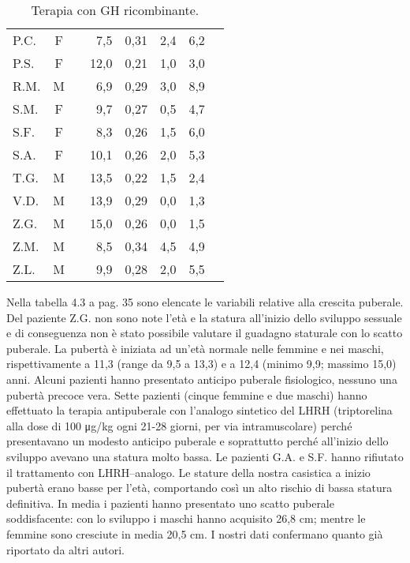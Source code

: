 \begin{table}[!h]
\begin{center}
\begin{tabular}{lccrcccl}
P.C.	& F &  		 & 7,5   	&  0,31     	& 2,4                 & 6,2  \\
P.S.	& F &  		 & 12,0  	&  0,21     	& 1,0                 & 3,0  \\
R.M.	& M & \checkmark & 6,9   	&  0,29     	& 3,0                 & 8,9  \\
S.M.	& F &  	  	 & 9,7   	&  0,27     	& 0,5                 & 4,7  \\
S.F.	& F &  		 & 8,3   	&  0,26     	& 1,5                 & 6,0  \\
S.A.	& F &  		 & 10,1  	&  0,26     	& 2,0                 & 5,3  \\
T.G.    & M &            & 13,5         &  0,22         & 1,5                 & 2,4  \\
V.D.	& M &  		 & 13,9  	&  0,29     	& 0,0                 & 1,3  \\
Z.G.	& M &  		 & 15,0  	&  0,26     	& 0,0                 & 1,5  \\
Z.M.	& M &  		 & 8,5   	&  0,34     	& 4,5                 & 4,9  \\
Z.L.	& M &  		 & 9,9   	&  0,28     	& 2,0                 & 5,5  \\
\bottomrule
\end{tabular}
\end{center}
\caption{Terapia con GH ricombinante.}
\label{tab:Terapia}
\end{table}

Nella tabella 4.3 a pag. 35 sono elencate le variabili relative alla crescita puberale. Del paziente Z.G. non sono note l'età e la statura all'inizio dello sviluppo sessuale e di conseguenza non è stato possibile valutare il guadagno staturale con lo scatto puberale.
La pubertà è iniziata ad un'età normale nelle femmine e nei maschi, rispettivamente a 11,3 (range da 9,5 a 13,3) e a 12,4 (minimo 9,9; massimo 15,0) anni. 
Alcuni pazienti hanno presentato anticipo puberale fisiologico, nessuno una pubertà precoce vera. 
Sette pazienti (cinque femmine e due maschi) hanno effettuato la terapia antipuberale con  l'analogo sintetico del LHRH (triptorelina alla dose di 100 \unit{\micro g}/kg ogni 21-28 giorni, per via intramuscolare) perché presentavano un modesto anticipo puberale e soprattutto perché all'inizio dello sviluppo avevano una statura molto bassa. Le pazienti G.A. e S.F. hanno rifiutato il trattamento con LHRH--analogo.
Le stature della nostra casistica a inizio pubertà erano basse per l'età, comportando così un alto rischio di bassa statura definitiva.
In media i pazienti hanno presentato uno scatto puberale soddisfacente: con lo sviluppo i maschi hanno acquisito 26,8 cm; mentre le femmine sono cresciute in media 20,5 cm. 
I nostri dati confermano quanto già riportato da altri autori.\cite{boonstra2003puberty} 
 

